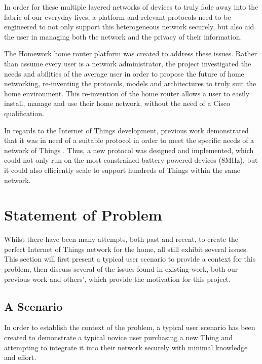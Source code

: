\documentclass{mprop}
\begin{document}
In order for these multiple layered networks of devices to truly fade away into the fabric of our everyday lives, a platform and relevant protocols need to be engineered to not only support this heterogeneous network securely, but also aid the user in managing both the network and the privacy of their information.

The Homework home router platform was created to address these issues. Rather than assume every user is a network administrator, the project investigated the needs and abilities of the average user in order to propose the future of home networking, re-inventing the protocols, models and architectures to truly suit the home environment. This re-invention of the home router allows a user to easily install, manage and use their home network, without the need of a Cisco qualification.

In regards to the Internet of Things development, previous work demonstrated that it was in need of a suitable protocol in order to meet the specific needs of a network of Things \cite{KNoT}. Thus, a new protocol was designed and implemented, which could not only run on the most constrained battery-powered devices (8MHz), but it could also efficiently scale to support hundreds of Things within the same network.




\section{Statement of Problem}
\label{sec:statement_of_problem}
Whilst there have been many attempts, both past and recent, to create the perfect Internet of Things network for the home, all still exhibit several issues. This section will first present a typical user scenario to provide a context for this problem, then discuss several of the issues found in existing work, both our previous work and others', which provide the motivation for this project.

\subsection{A Scenario} %
\label{sub:scenario}
In order to establish the context of the problem, a typical user scenario has been created to demonstrate a typical novice user purchasing a new Thing and attempting to integrate it into their network securely with minimal knowledge and effort.
\end{document}
